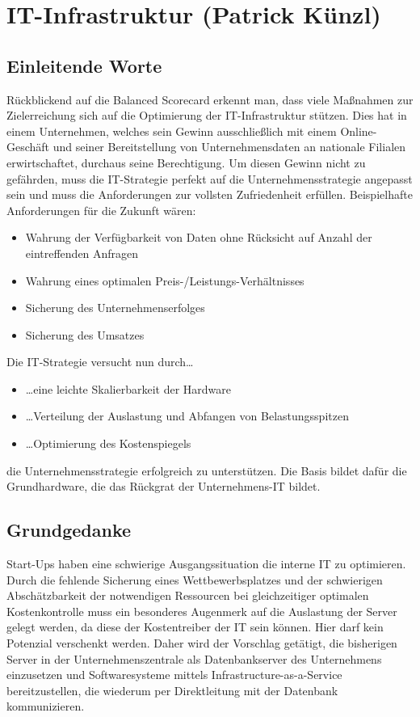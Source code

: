 \section{IT-Infrastruktur (Patrick Künzl)}
\subsection{Einleitende Worte}
Rückblickend auf die Balanced Scorecard erkennt man, dass viele Maßnahmen zur
Zielerreichung sich auf die Optimierung der IT-Infrastruktur stützen. Dies hat
in einem Unternehmen, welches sein Gewinn ausschließlich mit einem
Online-Geschäft und seiner Bereitstellung von Unternehmensdaten an nationale
Filialen erwirtschaftet, durchaus seine Berechtigung. Um diesen Gewinn nicht zu
gefährden, muss die IT-Strategie perfekt auf die Unternehmensstrategie angepasst
sein und muss die Anforderungen zur vollsten Zufriedenheit erfüllen.
Beispielhafte Anforderungen für die Zukunft wären:
\begin{itemize}
  \item Wahrung der Verfügbarkeit von Daten ohne Rücksicht auf Anzahl der
  eintreffenden Anfragen
  \item Wahrung eines optimalen Preis-/Leistungs-Verhältnisses
  \item Sicherung des Unternehmenserfolges
  \item Sicherung des Umsatzes
\end{itemize}
Die IT-Strategie versucht nun durch\ldots
\begin{itemize}
  \item \ldots eine leichte Skalierbarkeit der Hardware
  \item \ldots Verteilung der Auslastung und Abfangen von Belastungsspitzen
  \item \ldots Optimierung des Kostenspiegels
\end{itemize}
die Unternehmensstrategie erfolgreich zu unterstützen. Die Basis bildet dafür
die \glqq Grundhardware\glqq, die das Rückgrat der Unternehmens-IT bildet.
\subsection{Grundgedanke}
Start-Ups haben eine schwierige Ausgangssituation die interne IT zu optimieren.
Durch die fehlende Sicherung eines Wettbewerbsplatzes und der schwierigen
Abschätzbarkeit der notwendigen Ressourcen bei gleichzeitiger optimalen
Kostenkontrolle muss ein besonderes Augenmerk auf die Auslastung der Server
gelegt werden, da diese der Kostentreiber der IT sein können. Hier darf kein
Potenzial verschenkt werden. Daher wird der Vorschlag getätigt, die bisherigen
Server in der Unternehmenszentrale als Datenbankserver des Unternehmens
einzusetzen und Softwaresysteme mittels Infrastructure-as-a-Service
bereitzustellen, die wiederum per Direktleitung mit der Datenbank kommunizieren.
